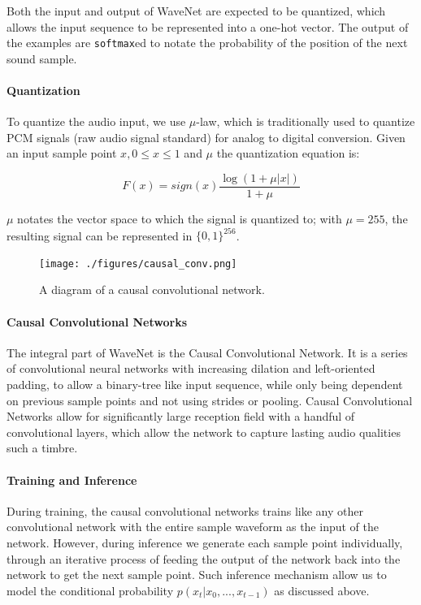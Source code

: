 \documentclass[]{article}
\begin{document}
Both the input and output of WaveNet are expected to be quantized, which
allows the input sequence to be represented into a one-hot vector. The
output of the examples are \texttt{softmax}ed to notate the probability
of the position of the next sound sample.

\paragraph{Quantization}

To quantize the audio input, we use \(\mu\)-law, which is traditionally
used to quantize PCM signals (raw audio signal standard) for analog to
digital conversion. Given an input sample point \(x, 0 \leq x \leq 1\)
and \(\mu\) the quantization equation is:

\begin{equation}
    F(x) = sign(x) \frac{\log(1 + \mu \lvert x \lvert )}{1 +  \mu}
\end{equation}

\(\mu\) notates the vector space to which the signal is quantized to;
with \(\mu = 255\), the resulting signal can be represented in
\(\{0, 1\}^{256}\).

\begin{figure}[h]
    \texttt{[image: ./figures/causal\_conv.png]}
    \centering
    \caption{A diagram of a causal convolutional network.} \label{fig:causal_conv}
\end{figure}

\paragraph{Causal Convolutional Networks}

The integral part of WaveNet is the Causal Convolutional Network. It is
a series of convolutional neural networks with increasing dilation and
left-oriented padding, to allow a binary-tree like input sequence, while
only being dependent on previous sample points and not using strides or
pooling. Causal Convolutional Networks allow for significantly large
reception field with a handful of convolutional layers, which allow the
network to capture lasting audio qualities such a timbre.

\paragraph{Training and Inference}

During training, the causal convolutional networks trains like any other
convolutional network with the entire sample waveform as the input of
the network. However, during inference we generate each sample point
individually, through an iterative process of feeding the output of the
network back into the network to get the next sample point. Such
inference mechanism allow us to model the conditional probability
\(p(x_t | x_0, ..., x_{t-1})\) as discussed above.
\end{document}
